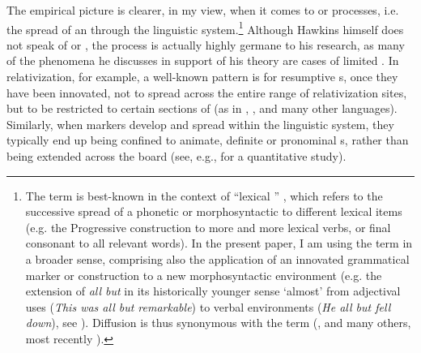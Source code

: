 \documentclass[output=paper]{langsci/langscibook}
\begin{document}
The empirical picture is clearer, in my view, when it comes to \textsc{} or \textsc{} processes, i.e. the spread of an  through the linguistic system.\footnote{The term \textsc{} is best-known in the context of “lexical ” \citep{Wang1969_Diff}, which refers to the successive spread of a phonetic or morphosyntactic  to different lexical items (e.g. the Progressive construction to more and more lexical verbs, or final consonant  to all relevant words). In the present paper, I am using the term  in a broader sense, comprising also the application of an innovated grammatical marker or construction to a new morphosyntactic environment (e.g. the extension of \textit{all but} in its historically younger sense ‘almost’ from adjectival uses (\textit{This was all but remarkable}) to verbal environments (\textit{He all but fell down}), see  \citealt{DeSmet2012_Act}). Diffusion is thus synonymous with the term \textsc{} (\citealt{Timberlake1977_Act}, \citealt{Andersen2001_Actual} and many others, most recently  \citealt{DeSmet2012_Act}).} Although Hawkins himself does not speak of  or , the process is actually highly germane to his research, as many of the phenomena he discusses in support of his  theory are cases of limited . In relativization, for example, a well-known pattern is for resumptive s, once they have been innovated, not to spread across the entire range of relativization sites, but to be restricted to certain sections of   (as in , ,  and many other languages). Similarly, when   markers develop and spread within the linguistic system, they typically end up being confined to animate, definite or pronominal s, rather than being extended across the board (see, e.g., \citealt{Sinnemäki2014} for a quantitative study). 
\end{document}
